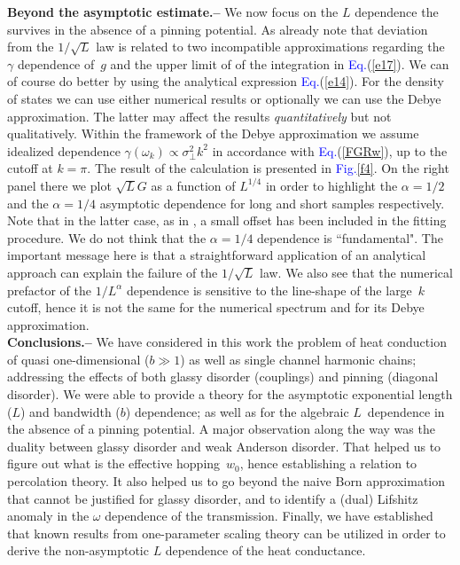 \documentclass[twocolumn,showpacs,aps,pre]{revtex4-1}
\newcommand{\Eq}[1]{{\textcolor{blue}{Eq.}}(\ref{#1})}
\newcommand{\Fig}[1] {{\textcolor{blue}{Fig.}}\ref{#1}}
\newcommand{\sect}[1]{{\bf #1.-- }}
\begin{document}
\sect{Beyond the asymptotic estimate}
%
We now focus on the $L$ dependence the survives in the absence of a pinning potential.
As already note that deviation from the $1/\sqrt{L}$ law is related to two incompatible 
approximations regarding the~$\gamma$ dependence of~$g$ 
and the upper limit of of the integration in \Eq{e17}.    
We can of course do better by using the analytical expression \Eq{e14}.
For the density of states we can use either numerical results 
or optionally we can use the Debye approximation. The latter 
may affect the results {\em quantitatively} but not qualitatively.
Within the framework of the Debye approximation we assume 
idealized dependence $\gamma(\omega_k) \propto \sigma_{\perp}^2 k^2$ 
in accordance with \Eq{FGRw}, up to the cutoff at $k=\pi$.
%
The result of the calculation is presented in \Fig{f4}.  
On the right panel there we plot $\sqrt{L}G$ as a function of $L^{1/4}$ 
in order to highlight the ${\alpha=1/2}$ and the ${\alpha=1/4}$ 
asymptotic dependence for long and short samples respectively. 
Note that in the latter case, as in \cite{BZFK13},  
a small offset has been included in the fitting procedure.
We do not think that the ${\alpha=1/4}$ dependence is ``fundamental". 
The important message here is that a straightforward application 
of an analytical approach can explain the failure of the $1/\sqrt{L}$ law. 
We also see that the numerical prefactor of the $1/L^{\alpha}$ dependence 
is sensitive to the line-shape of the large~$k$ cutoff, 
hence it is not the same for the numerical spectrum and for its Debye approximation. 
\\

\sect{Conclusions} 
%
We have considered in this work the problem 
of heat conduction of quasi one-dimensional ($b\gg1$) 
as well as single channel harmonic chains; 
addressing the effects of both glassy disorder (couplings) and pinning (diagonal disorder).
We were able to provide a theory for the asymptotic exponential 
length ($L$) and bandwidth ($b$) dependence; as well as for the 
algebraic $L$~dependence in the absence of a pinning potential. 
A major observation along the way was the duality between 
glassy disorder and weak Anderson disorder. That helped 
us to figure out what is the effective hopping~$w_0$, 
hence establishing a relation to percolation theory.
It also helped us to go beyond the naive Born approximation
that cannot be justified for glassy disorder, 
and to identify a (dual) Lifshitz anomaly in 
the $\omega$ dependence of the transmission. 
Finally, we have established that known results from 
one-parameter scaling theory can be utilized in order 
to derive the non-asymptotic $L$ dependence of the heat conductance. \\  
     
\end{document}
